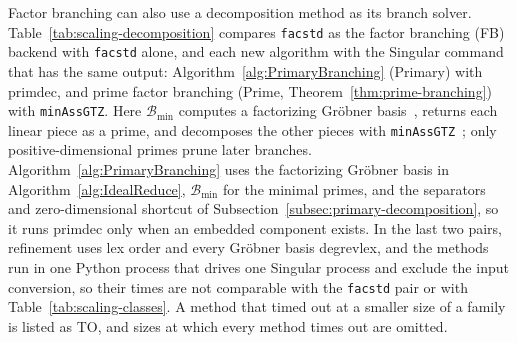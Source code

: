 Factor branching can also use a decomposition method as its branch solver.
Table~\ref{tab:scaling-decomposition} compares \texttt{facstd} as the factor
branching (FB) backend with \texttt{facstd} alone, and each new algorithm with
the Singular command that has the same output: Algorithm~\ref{alg:PrimaryBranching}
(Primary) with primdec, and prime factor branching (Prime,
Theorem~\ref{thm:prime-branching}) with \texttt{minAssGTZ}. Here $\mathcal B_{\min}$ computes a factorizing Gr\"obner
basis~\cite{graebe1995factorized}, returns each linear piece as a prime, and
decomposes the other pieces with \texttt{minAssGTZ}~\cite{gianni1988primary};
only positive-dimensional primes prune later branches.
Algorithm~\ref{alg:PrimaryBranching} uses the factorizing Gr\"obner basis in
Algorithm~\ref{alg:IdealReduce}, $\mathcal B_{\min}$ for the minimal primes,
and the separators and zero-dimensional shortcut of
Subsection~\ref{subsec:primary-decomposition}, so it runs primdec only when an
embedded component exists. In the last two pairs, refinement uses lex order
and every Gr\"obner basis degrevlex, and the methods run in one Python process
that drives one Singular process and exclude the input conversion, so their
times are not comparable with the \texttt{facstd} pair or with
Table~\ref{tab:scaling-classes}. A method that timed out at a smaller size of
a family is listed as TO, and sizes at which every method times out are
omitted.

